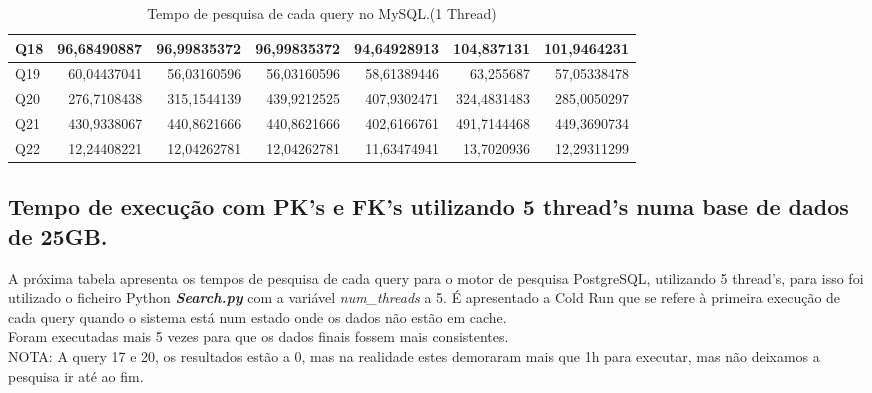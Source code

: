 \documentclass{article}
\begin{document}
\begin{table}[H]
{\begin{tabular}{|l|r|r|r|r|r|r|}
Q18&	96,68490887&	96,99835372&	96,99835372&	94,64928913	&104,837131	&101,9464231\\ \hline
Q19&	60,04437041&	56,03160596&	56,03160596&	58,61389446	&63,255687	&57,05338478\\ \hline
Q20&	276,7108438&	315,1544139&	439,9212525&	407,9302471	&324,4831483&	285,0050297\\ \hline
Q21&	430,9338067&	440,8621666&	440,8621666&	402,6166761	&491,7144468&	449,3690734 \\ \hline
Q22&	12,24408221&	12,04262781&	12,04262781&	11,63474941	&13,7020936	&12,29311299\\ \hline
    \end{tabular}}
    \caption{Tempo de pesquisa de cada query no MySQL.(1 Thread)}
    \label{tab:BC_Table3}
  \end{table}









\clearpage
\subsection{Tempo de execução com PK's e FK's utilizando 5 thread's numa base de dados de 25GB.}
\quad A próxima tabela apresenta os tempos de pesquisa de cada query para o motor de pesquisa PostgreSQL, utilizando 5 thread's, para isso foi utilizado o ficheiro Python \textbf{\textit{Search.py}}  com a variável \textit{num\_threads} a 5. 
\quad É apresentado a Cold Run que se refere à primeira execução de cada query quando o sistema está num estado onde os dados não estão em cache.\\
Foram executadas mais 5 vezes para que os dados finais fossem mais consistentes.\\
NOTA: A query 17 e 20, os resultados estão a 0, mas na realidade estes demoraram mais que 1h para executar, mas não deixamos a pesquisa ir até ao fim.
\end{document}
